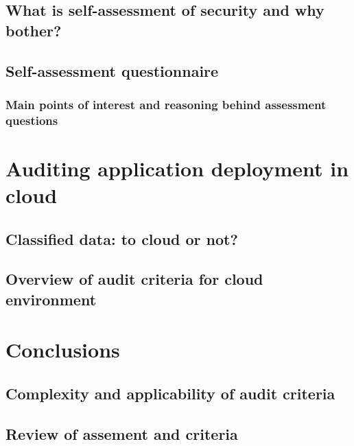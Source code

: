 \documentclass{article}
\begin{document}
\subsection{What is self-assessment of security and why bother?}
\blindtext[2]
\subsection{Self-assessment questionnaire}
\blindtext[2]
\subsubsection{Main points of interest and reasoning behind assessment questions}
\blindtext[2]
\section{Auditing application deployment in cloud}
\blindtext[2]
\subsection{Classified data: to cloud or not?}
\blindtext[2]
\subsection{Overview of audit criteria for cloud environment}
\blindtext[2]
\section{Conclusions}
\blindtext[2]
\subsection{Complexity and applicability of audit criteria}
\blindtext[2]
\subsection{Review of assement and criteria}
\blindtext[2]
\end{document}
